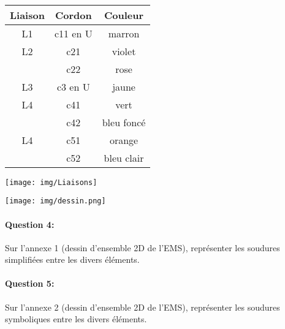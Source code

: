~\

\begin{minipage}{0.45\linewidth}
 \begin{center}
  \begin{tabular}{|c|c|c|}
  \hline
  Liaison & Cordon & Couleur \\
  \hline
  L1 & c11 en U & marron \\
  \hline
  L2 & c21 & violet \\
  \cline{2-3}
   & c22 & rose \\
  \hline
  L3 & c3 en U & jaune \\
  \hline
  L4 & c41 & vert \\
  \cline{2-3}
  & c42 & bleu foncé \\
  \hline
  L4 & c51 & orange \\
  \cline{2-3}
  & c52 & bleu clair \\
  \hline
  \end{tabular} 
 \end{center}
\end{minipage}
\begin{minipage}{0.45\linewidth}
\begin{center}
 \texttt{[image: img/Liaisons]}
\end{center}
\end{minipage}

\begin{center}
 \texttt{[image: img/dessin.png]}
\end{center}

\paragraph{Question 4:} Sur l'annexe 1 (dessin d'ensemble 2D de l'EMS), représenter les soudures simplifiées entre les divers éléments.

\paragraph{Question 5:} Sur l'annexe 2 (dessin d'ensemble 2D de l'EMS), représenter les soudures symboliques entre les divers éléments.

%
%
%

\newpage





